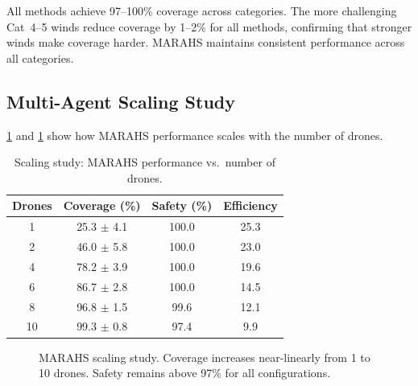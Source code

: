 \documentclass[11pt,twocolumn]{article}
\providecommand{\Cref}[1]{\ref{#1}}
\theoremstyle{definition}
\begin{document}
All methods achieve 97--100\% coverage across categories. The more challenging Cat~4--5 winds reduce coverage by 1--2\% for all methods, confirming that stronger winds make coverage harder. MARAHS maintains consistent performance across all categories.

\subsection{Multi-Agent Scaling Study}
\label{sec:scaling}

\Cref{tab:scaling} and \Cref{fig:scaling} show how MARAHS performance scales with the number of drones.

\begin{table}[t]
\centering
\caption{Scaling study: MARAHS performance vs.\ number of drones.}
\label{tab:scaling}
\small
\begin{tabular}{cccc}
\toprule
\textbf{Drones} & \textbf{Coverage (\%)} & \textbf{Safety (\%)} & \textbf{Efficiency} \\
\midrule
1  & 25.3 $\pm$ 4.1 & 100.0 & 25.3 \\
2  & 46.0 $\pm$ 5.8 & 100.0 & 23.0 \\
4  & 78.2 $\pm$ 3.9 & 100.0 & 19.6 \\
6  & 86.7 $\pm$ 2.8 & 100.0 & 14.5 \\
8  & 96.8 $\pm$ 1.5 & 99.6  & 12.1 \\
10 & 99.3 $\pm$ 0.8 & 97.4  & 9.9  \\
\bottomrule
\end{tabular}
\end{table}

\begin{figure}[t]
\centering
{}
\caption{MARAHS scaling study. Coverage increases near-linearly from 1 to 10 drones. Safety remains above 97\% for all configurations.}
\label{fig:scaling}
\end{figure}
\end{document}
